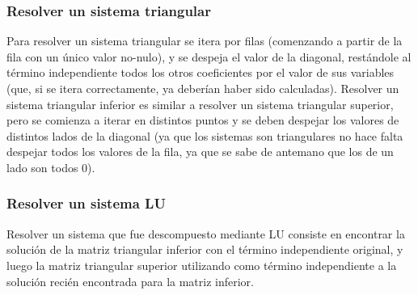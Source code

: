 \subsubsection{Resolver un sistema triangular}
\par Para resolver un sistema triangular se itera por filas (comenzando a partir de la fila con un \'unico valor no-nulo), y se despeja el valor de la diagonal, rest\'andole al t\'ermino independiente todos los otros coeficientes por el valor de sus variables (que, si se itera correctamente, ya deber\'ian haber sido calculadas). Resolver un sistema triangular inferior es similar a resolver un sistema triangular superior, pero se comienza a iterar en distintos puntos y se deben despejar los valores de distintos lados de la diagonal (ya que los sistemas son triangulares no hace falta despejar todos los valores de la fila, ya que se sabe de antemano que los de un lado son todos 0).
\subsubsection{Resolver un sistema LU}
\par Resolver un sistema que fue descompuesto mediante LU consiste en encontrar la soluci\'on de la matriz triangular inferior con el t\'ermino independiente original, y luego la matriz triangular superior utilizando como t\'ermino independiente a la soluci\'on reci\'en encontrada para la matriz inferior.

